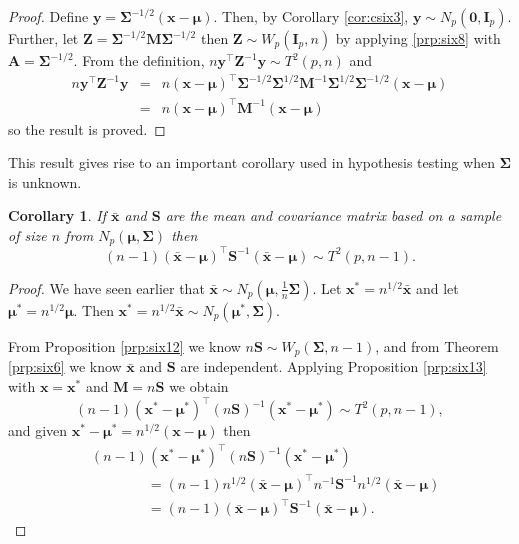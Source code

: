 \documentclass[
]{book}
\newtheorem{corollary}{Corollary}[chapter]
\theoremstyle{definition}
\theoremstyle{definition}
\theoremstyle{definition}
\theoremstyle{definition}
\theoremstyle{remark}
\begin{document}
\begin{proof}
Define \(\mathbf y= \boldsymbol{\Sigma}^{-1/2}(\mathbf x-{\boldsymbol{\mu}})\). Then, by Corollary \ref{cor:csix3}, \(\mathbf y\sim N_p(\boldsymbol 0,\mathbf I_p)\). Further, let \(\mathbf Z= \boldsymbol{\Sigma}^{-1/2} \mathbf M\boldsymbol{\Sigma}^{-1/2}\) then \(\mathbf Z\sim W_p(\mathbf I_p,n)\) by applying \ref{prp:six8} with \(\mathbf A= \boldsymbol{\Sigma}^{-1/2}\). From the definition, \(n \mathbf y^\top \mathbf Z^{-1} \mathbf y\sim T^2(p,n)\) and
\begin{eqnarray*}
n \mathbf y^\top \mathbf Z^{-1} \mathbf y&=& n (\mathbf x-{\boldsymbol{\mu}})^\top \boldsymbol{\Sigma}^{-1/2} \boldsymbol{\Sigma}^{1/2} \mathbf M^{-1} \boldsymbol{\Sigma}^{1/2} \boldsymbol{\Sigma}^{-1/2} (\mathbf x-{\boldsymbol{\mu}}) \\
&=& n(\mathbf x-{\boldsymbol{\mu}})^\top \mathbf M^{-1}(\mathbf x-{\boldsymbol{\mu}})
\end{eqnarray*}
so the result is proved.
\end{proof}

This result gives rise to an important corollary used in hypothesis testing when \(\boldsymbol{\Sigma}\) is unknown.

\begin{corollary}
\protect\hypertarget{cor:csix5}{}{\label{cor:csix5} }If \(\bar{\mathbf x}\) and \(\mathbf S\) are the mean and covariance matrix based on a sample of size \(n\) from \(N_p({\boldsymbol{\mu}},\boldsymbol{\Sigma})\) then
\[ (n-1)(\bar{\mathbf x}-{\boldsymbol{\mu}})^\top \mathbf S^{-1} (\bar{\mathbf x}-{\boldsymbol{\mu}}) \sim T^2(p,n-1).\]
\end{corollary}

\begin{proof}
We have seen earlier that \(\bar{\mathbf x} \sim N_p({\boldsymbol{\mu}},\frac{1}{n}\boldsymbol{\Sigma})\). Let \(\mathbf x^\ast = n^{1/2} \bar{\mathbf x}\) and let \({\boldsymbol{\mu}}^\ast = n^{1/2} {\boldsymbol{\mu}}\). Then \(\mathbf x^\ast=n^{1/2} \bar{\mathbf x} \sim N_p({\boldsymbol{\mu}}^\ast, \boldsymbol{\Sigma})\).

From Proposition \ref{prp:six12} we know \(n\mathbf S\sim W_p(\boldsymbol{\Sigma},n-1)\), and from Theorem \ref{prp:six6} we know \(\bar{\mathbf x}\) and \(\mathbf S\) are independent. Applying Proposition \ref{prp:six13} with \(\mathbf x= \mathbf x^\ast\) and \(\mathbf M= n\mathbf S\) we obtain
\[ (n-1)(\mathbf x^\ast - {\boldsymbol{\mu}}^\ast)^\top (n\mathbf S)^{-1} (\mathbf x^\ast - {\boldsymbol{\mu}}^\ast) \sim T^2(p,n-1),\]
and given \(\mathbf x^\ast - {\boldsymbol{\mu}}^\ast = n^{1/2} (\mathbf x-{\boldsymbol{\mu}})\) then
\begin{align*}
&(n-1)(\mathbf x^\ast - {\boldsymbol{\mu}}^\ast)^\top (n\mathbf S)^{-1} (\mathbf x^\ast - {\boldsymbol{\mu}}^\ast)\\
& \qquad \qquad = (n-1)n^{1/2}(\bar{\mathbf x}-{\boldsymbol{\mu}})^\top n^{-1} \mathbf S^{-1} n^{1/2}(\bar{\mathbf x}-{\boldsymbol{\mu}}) \\
&\qquad \qquad = (n-1)(\bar{\mathbf x}-{\boldsymbol{\mu}})^\top \mathbf S^{-1} (\bar{\mathbf x}-{\boldsymbol{\mu}}).
\end{align*}
\end{proof}
\end{document}
